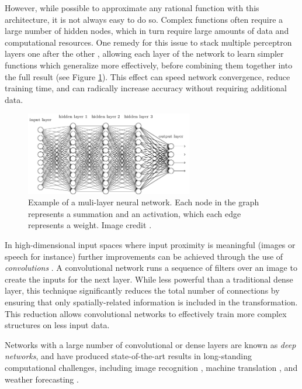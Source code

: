 However, while possible to approximate any rational function with this architecture, it is not always easy to do so. Complex functions often require a large number of hidden nodes, which in turn require large amounts of data and computational resources. One remedy for this issue to stack multiple perceptron layers one after the other \citep{Rumelhart1985LearningPropagation}, allowing each layer of the network to learn simpler functions which generalize more effectively, before combining them together into the full result (see Figure \ref{fig:deep_network}). This effect can speed network convergence, reduce training time, and can radically increase accuracy without requiring additional data. 

\begin{figure}[ht]
\includegraphics[width=0.65\textwidth]{fig/deep_network.png}
\centering
\caption{Example of a muli-layer neural network. Each node in the graph represents a summation and an activation, which each edge represents a weight. Image credit \cite{Nielsen2015NeuralLearning}.}
\label{fig:deep_network}
\end{figure}

In high-dimensional input spaces where input proximity is meaningful (images or speech for instance) further improvements can be achieved through the use of \textit{convolutions} \citep{Fukushima1980Neocognitron:Position}. A convolutional network runs a sequence of filters over an image to create the inputs for the next layer. While less powerful than a traditional dense layer, this technique significantly reduces the total number of connections by ensuring that only spatially-related information is included in the transformation. This reduction allows convolutional networks to effectively train more complex structures on less input data.

Networks with a large number of convolutional or dense layers are known as \textit{deep networks}, and have produced state-of-the-art results in long-standing computational challenges, including image recognition \citep{Davis2018Real-TimeDrones}, machine translation \citep{Bahdanau2014NeuralTranslate}, and weather forecasting \citep{McGovern2017UsingWeather}. 


